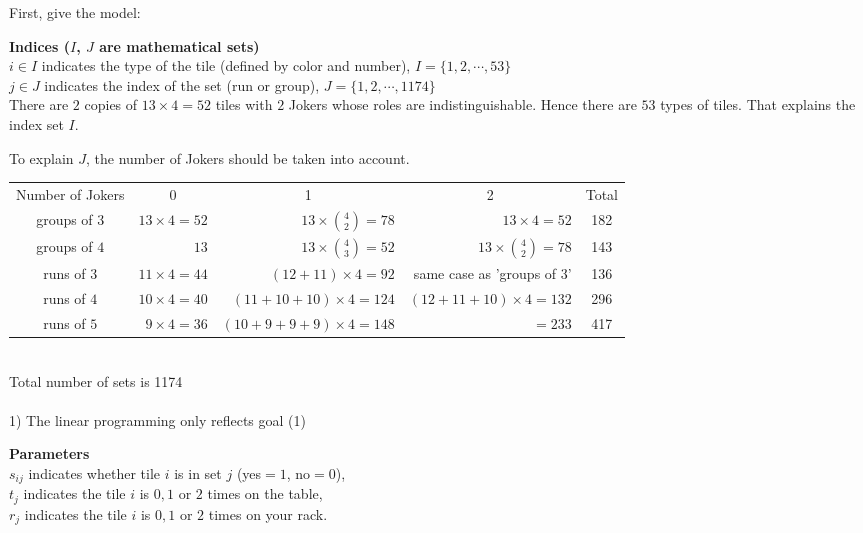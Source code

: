 \documentclass[11pt]{article}
\begin{document}
	First, give the model:
	
	\textbf{Indices ($I$, $J$ are mathematical sets)}\\
	$i \in I$ indicates the type of the tile (defined by color and number), $I=\{1,2, \cdots , 53\}$\\
	$j \in J$ indicates the index of the set (run or group), $J=\{1,2, \cdots, 1174\}$\\
	
	There are $2$ copies of $13\times4=52$ tiles with $2$ Jokers whose roles are indistinguishable. Hence there are $53$ types of tiles. That explains the index set $I$.
	
	To explain $J$, the number of Jokers should be taken into account.\\
	
	
\begin{tabular}{|c|r|r|r|c}
\cline{1-4}
Number of Jokers & \multicolumn{1}{c|}{0} & \multicolumn{1}{c|}{1}       & \multicolumn{1}{c|}{2}           & Total \\ \cline{1-4}
groups of $3$    & $13\times4=52$         & $13\times{{4}\choose{2}}=78$ & $13\times4=52$                   & 182    \\ \cline{1-4}
groups of $4$    & $13$                   & $13\times{{4}\choose{3}}=52$ & $13\times{{4}\choose{2}}=78$     & 143   \\ \cline{1-4}
runs of $3$      & $11\times4=44$         & $(12+11)\times4=92$          & same case as 'groups of $3$' & 136   \\ \cline{1-4}
runs of $4$      & $10\times4=40$         & $(11+10+10)\times4=124$      & $(12+11+10)\times4=132$          & 296   \\ \cline{1-4}
runs of $5$      & $9\times4=36$          & $(10+9+9+9)\times4=148$      & $=233$                           & 417   \\ \cline{1-4}
\end{tabular}\\


Total number of sets is 1174\\
\\
{\large 1) The linear programming only reflects goal (1)}

	\textbf{Parameters}\\
	$s_{ij}$ indicates whether tile $i$ is in set $j$ (yes$=1$, no$=0$),\\
	$t_j$ indicates the tile $i$ is $0,1$ or $2$ times on the table,\\
	$r_j$ indicates the tile $i$ is $0,1$ or $2$ times on your rack.
	
\end{document}
